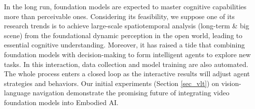 In the long run, foundation models are expected to master cognitive capabilities more than perceivable ones. Considering its feasibility, we suppose one of its research trends is to achieve large-scale spatiotemporal analysis (long-term \& big scene) from the foundational dynamic perception in the open world, leading to essential cognitive understanding.
Moreover, it has raised a tide that combining foundation models with decision-making to form intelligent agents to explore new tasks. In this interaction, data collection and model training are also automated. The whole process enters a closed loop as the interactive results will adjust agent strategies and behaviors. Our initial experiments (Section \ref{sec_vlt}) on vision-language navigation demonstrate the promising future of integrating video foundation models into Embodied AI.
